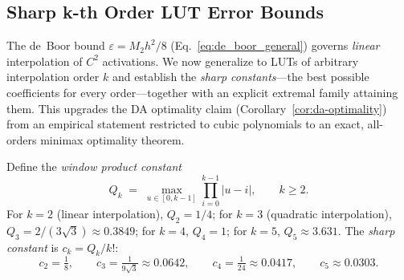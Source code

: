 
\subsection{Sharp k-th Order LUT Error Bounds}
\label{sec:lut-sharp}

The de~Boor bound $\varepsilon = M_2 h^2/8$ (Eq.~\ref{eq:de_boor_general})
governs \emph{linear} interpolation of $C^2$ activations. We now generalize
to LUTs of arbitrary interpolation order $k$ and establish the \emph{sharp
constants}---the best possible coefficients for every order---together with
an explicit extremal family attaining them. This upgrades the DA
optimality claim (Corollary~\ref{cor:da-optimality}) from an empirical
statement restricted to cubic polynomials to an exact, all-orders minimax
optimality theorem.

Define the \emph{window product constant}
\begin{equation}
Q_k \;=\; \max_{u \in [0, k-1]} \prod_{i=0}^{k-1} |u - i|,
\qquad k \geq 2.
\label{eq:window_product}
\end{equation}
For $k=2$ (linear interpolation), $Q_2 = 1/4$; for $k=3$ (quadratic
interpolation), $Q_3 = 2/(3\sqrt{3}) \approx 0.3849$; for $k=4$,
$Q_4 = 1$; for $k=5$, $Q_5 \approx 3.631$. The \emph{sharp constant} is
$c_k = Q_k / k!$:
\begin{equation}
c_2 = \tfrac{1}{8}, \qquad
c_3 = \tfrac{1}{9\sqrt{3}} \approx 0.0642, \qquad
c_4 = \tfrac{1}{24} \approx 0.0417, \qquad
c_5 \approx 0.0303.
\label{eq:sharp_constants}
\end{equation}

